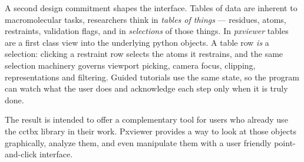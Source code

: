 \documentclass[11pt]{article}
\newcommand{\pxviewer}{\emph{pxviewer}}
\begin{document}
A second design commitment shapes the interface. Tables of data are inherent to macromolecular tasks, researchers think in
\emph{tables of things} --- residues, atoms, restraints, validation flags, and in \emph{selections} of those things. 
In \pxviewer{} tables are a first class view into the underlying python objects. A table row \emph{is}
a selection: clicking a restraint row selects the atoms it restrains, and the
same selection machinery governs viewport picking, camera focus, clipping,
representations and filtering. Guided tutorials use the same state, so the
program can watch what the user does and acknowledge each step only when it
is truly done.

The result is intended to offer a complementary tool for users who already use the cctbx library in their work. 
Pxviewer provides a way to look at those objects graphically, analyze them, and even manipulate them with a user friendly point-and-click interface.
\end{document}
